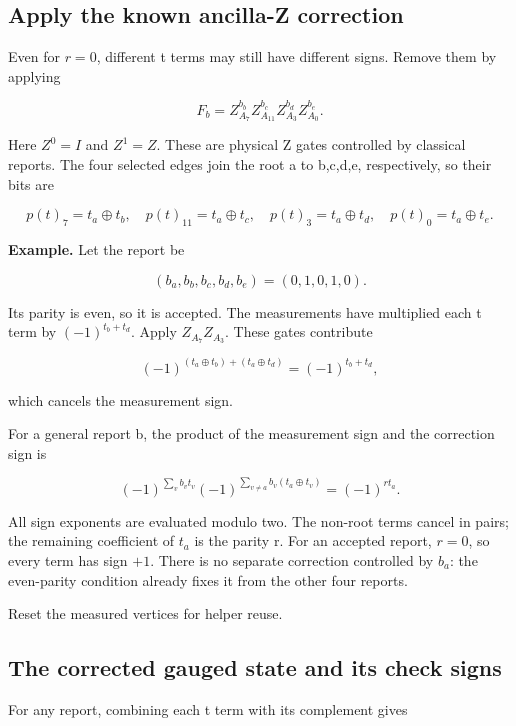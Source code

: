 \documentclass[11pt]{article}
\begin{document}
\subsection{Apply the known ancilla-Z correction}
Even for \(r=0\), different t terms may still have different signs. Remove them by applying

\[
F_b=Z_{A_7}^{b_b}Z_{A_{11}}^{b_c}Z_{A_3}^{b_d}Z_{A_0}^{b_e}.
\]

Here \(Z^0=I\) and \(Z^1=Z\). These are physical Z gates controlled by classical reports. The four selected edges join the root a to b,c,d,e, respectively, so their bits are

\[
p(t)_7=t_a\oplus t_b,\quad
p(t)_{11}=t_a\oplus t_c,\quad
p(t)_3=t_a\oplus t_d,\quad
p(t)_0=t_a\oplus t_e.
\]

\begin{center}\begin{minipage}{\linewidth}

\end{minipage}\end{center}

\textbf{Example.} Let the report be

\[
(b_a,b_b,b_c,b_d,b_e)=(0,1,0,1,0).
\]

Its parity is even, so it is accepted. The measurements have multiplied each t term by \((-1)^{t_b+t_d}\). Apply \(Z_{A_7}Z_{A_3}\). These gates contribute

\[
(-1)^{(t_a\oplus t_b)+(t_a\oplus t_d)}
=(-1)^{t_b+t_d},
\]

which cancels the measurement sign.

For a general report b, the product of the measurement sign and the correction sign is

\[
(-1)^{\sum_vb_vt_v}
(-1)^{\sum_{v\ne a}b_v(t_a\oplus t_v)}
=(-1)^{r t_a}.
\]

All sign exponents are evaluated modulo two. The non-root terms cancel in pairs; the remaining coefficient of \(t_a\) is the parity r. For an accepted report, \(r=0\), so every term has sign \(+1\). There is no separate correction controlled by \(b_a\): the even-parity condition already fixes it from the other four reports.

Reset the measured vertices for helper reuse.

\subsection{The corrected gauged state and its check signs}
For any report, combining each t term with its complement gives
\end{document}
